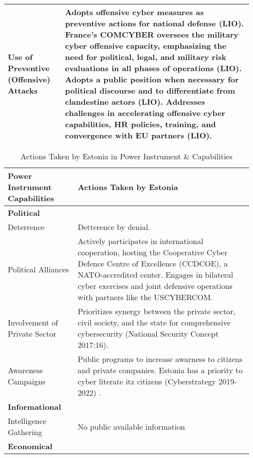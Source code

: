 \begin{table}[h]
\begin{tabular}{>{\raggedright}p{4cm} p{11cm}}
\hspace{0.2cm} Use of Preventive (Offensive) Attacks & Adopts offensive cyber measures as preventive actions for national defense (LIO). France's COMCYBER oversees the military cyber offensive capacity, emphasizing the need for political, legal, and military risk evaluations in all phases of operations (LIO). Adopts a public position when necessary for political discourse and to differentiate from clandestine actors (LIO). Addresses challenges in accelerating offensive cyber capabilities, HR policies, training, and convergence with EU partners (LIO). \\
\bottomrule
\end{tabular}
\end{table}


\begin{table}[h]
\centering
\renewcommand{\arraystretch}{1.5} %
\caption{Actions Taken by Estonia in Power Instrument \& Capabilities}
\begin{tabular}{>{\raggedright}p{4cm} p{11cm}}
\toprule
\textbf{Power Instrument Capabilities} & \textbf{Actions Taken by Estonia} \\
\midrule
\textbf{Political} & \\
\hspace{0.2cm} Deterrence & Detterence by denial. \\
\hspace{0.2cm} Political Alliances &Actively participates in international cooperation, hosting the Cooperative Cyber Defence Centre of Excellence (CCDCOE), a NATO-accredited center. Engages in bilateral cyber exercises and joint defensive operations with partners like the USCYBERCOM. \\
\hspace{0.2cm} Involvement of Private Sector &  Prioritizes synergy between the private sector, civil society, and the state for comprehensive cybersecurity (National Security Concept 2017:16). \\
\hspace{0.2cm} Awareness Campaigns & Public programs to increase awarness to citizens and private companies. Estonia has a priority to cyber literate itz citizens (Cyberstrategy 2019-2022) . \\
\midrule
\textbf{Informational} & \\
\hspace{0.2cm} Intelligence Gathering & No public available information \\
\midrule
\textbf{Economical} & \\

\end{tabular}
\end{table}
